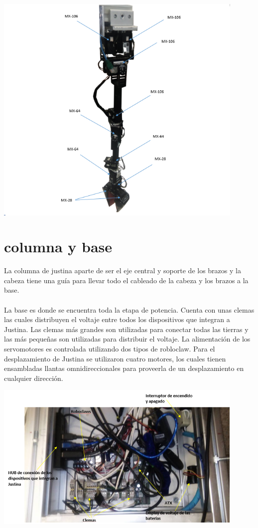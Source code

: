 \documentclass[user_manual.tex]{subfiles}
\begin{document}
\begin{center}
\includegraphics[width=0.9\textwidth]{Figures/Hardware/Diagramas/Brazo.png}
\label{fig:Hardware:Diagramas:Justina:Brazo}
\end{center}
\section{columna y base}
La columna de justina aparte de ser el eje central y soporte de los brazos y la cabeza tiene una guía para llevar todo el
cableado de la cabeza y los brazos a la base.\\
\\
La base es donde se encuentra toda la etapa de potencia. Cuenta con unas clemas las cuales distribuyen el voltaje entre 
todos los dispositivos que integran a Justina. Las clemas más grandes son utilizadas para conectar todas las tierras y las
más pequeñas son utilizadas para distribuir el voltaje. La alimentación de los servomotores es controlada utilizando dos tipos
de robloclaw. Para el desplazamiento de Justina se utilizaron cuatro motores, los cuales tienen ensambladas llantas omnidireccionales
para proveerla de un desplazamiento en cualquier dirección.

\begin{center}
\includegraphics[width=0.9\textwidth]{Figures/Hardware/Diagramas/Base.png}
\label{fig:Hardware:Diagramas:Justina:Base}
\end{center}
\end{document}
